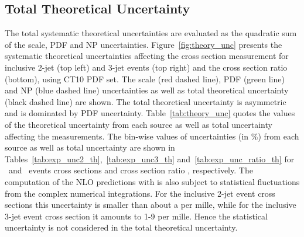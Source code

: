 \subsection{Total Theoretical Uncertainty}
The total systematic theoretical uncertainties are evaluated as the quadratic sum of the scale, PDF and NP uncertainties. Figure~\ref{fig:theory_unc} presents the systematic theoretical uncertainties affecting the cross section measurement for inclusive 2-jet (top left) and 3-jet events (top right) and the cross section ratio \ratio (bottom), using CT10 PDF set. The scale (red dashed line), PDF (green line) and NP (blue dashed line) uncertainties as well as total theoretical uncertainty (black dashed line) are shown. The total theoretical uncertainty is asymmetric and is dominated by PDF uncertainty. Table~\ref{tab:theory_unc} quotes the values of the theoretical uncertainty from each source as well as total uncertainty affecting the measurements. The bin-wise values of uncertainties (in \%) from each source as well as total uncertainty are shown in Tables~\ref{tab:exp_unc2_th},~\ref{tab:exp_unc3_th} and~\ref{tab:exp_unc_ratio_th} for \njt~and \njth~events cross sections and cross section ratio \ratio, respectively. The computation of the NLO predictions with \NLOJETPP is also subject to statistical fluctuations from the complex numerical integrations. For the inclusive 2-jet event cross sections this uncertainty is smaller than about a per mille, while for the inclusive 3-jet event cross section it amounts to 1-9 per mille. Hence the statistical uncertainty is not considered in the total theoretical uncertainty.


